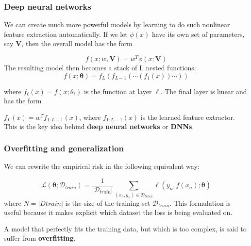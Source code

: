 \documentclass[spanish]{beamer}
\begin{document}
\begin{frame}
\frametitle{Deep neural networks}
We can create much more powerful models by learning  to do such nonlinear feature extraction automatically. If we let $ \phi(x)$ have its own set of parameters,
say $\boldsymbol{V}$, then the overall model has the form

\begin{equation*}
f(x;w,\boldsymbol{V})= w^T \phi(x;\boldsymbol{V})
\end{equation*}
The resulting model then becomes a stack of L nested functions:
\begin{equation*}
f(x;\boldsymbol{\theta})= f_{L}(f_{L-1}(\cdots (f_{1}(x)) \cdots))
\end{equation*}

where $f_{\ell}(x) = f(x;\theta_{\ell})$ is the function at layer $\ell$. The final layer is linear and has the form

$f_{L}(x) = w^T f_{1:L-1}(x)$, where $f_{1:L-1}(x)$ is the learned feature extractor. This is the key idea behind
\textbf{deep neural networks} or \textbf{DNNs}.

\end{frame}
\begin{frame}
\frametitle{Overfitting and generalization}
We can rewrite the empirical risk in the following equivalent way:

\begin{equation*}
\mathcal{L}(\mathbf{\theta}; \mathcal{D}_{train})= \frac{1}{\vert \mathcal{D}_{train}\vert }  \sum_{(x_n,y_n)\in \mathcal{D}_{train}  } \ell (y_{n}, f(x_{n});\boldsymbol{\theta})
\end{equation*}
where $N = \vert Dtrain \vert$ is the size of the training set $ \mathcal{D}_{train}$. This formulation is useful because it makes
explicit which dataset the loss is being evaluated on.

 A model that perfectly fits the training data, but which is too complex, is said to suffer from \textbf{overfitting}.

\end{frame}
\end{document}
